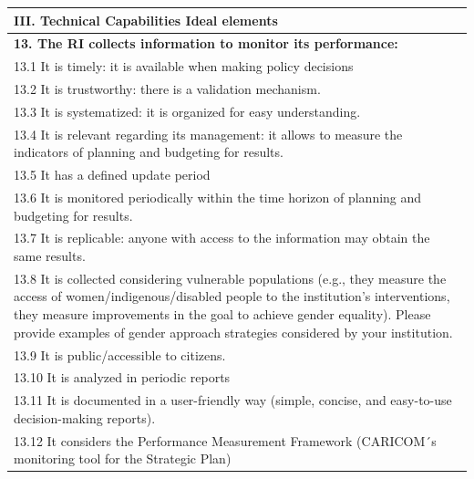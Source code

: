 \documentclass[
  10pt,
]{book}
\begin{document}
\begin{table}
\centering
\begin{tabular}[t]{l}
\hline
III. Technical Capabilities Ideal elements\\
\hline
\multicolumn{1}{l}{\textbf{13. The RI collects information to monitor its performance:}}\\
\hline
\hspace{1em}13.1 It is timely: it is available when making policy decisions\\
\hline
\hspace{1em}13.2 It is trustworthy: there is a validation mechanism.\\
\hline
\hspace{1em}13.3 It is systematized: it is organized for easy understanding.\\
\hline
\hspace{1em}13.4 It is relevant regarding its management: it allows to measure the indicators of planning and budgeting for results.\\
\hline
\hspace{1em}13.5 It has a defined update period\\
\hline
\hspace{1em}13.6 It is monitored periodically within the time horizon of planning and budgeting for results.\\
\hline
\hspace{1em}13.7 It is replicable: anyone with access to the information may obtain the same results.\\
\hline
\hspace{1em}13.8 It is collected considering vulnerable populations (e.g., they measure the access of women/indigenous/disabled people to the institution’s interventions, they measure improvements in the goal to achieve gender equality). Please provide examples of gender approach strategies considered by your institution.\\
\hline
\hspace{1em}13.9 It is public/accessible to citizens.\\
\hline
\hspace{1em}13.10 It is analyzed in periodic reports\\
\hline
\hspace{1em}13.11 It is documented in a user-friendly way (simple, concise, and easy-to-use decision-making reports).\\
\hline
\hspace{1em}13.12 It considers the Performance Measurement Framework (CARICOM´s monitoring tool for the Strategic Plan)\\

\end{tabular}
\end{table}
\end{document}
